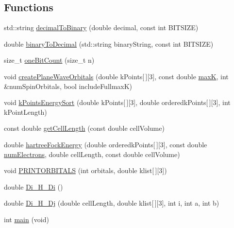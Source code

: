 \subsection*{Functions}
\begin{DoxyCompactItemize}
\item 
std\-::string \hyperlink{kPoints__ordered__FCIQMC_8C_ad90cfa61d31ce5c25047ff4ba86637f1}{decimal\-To\-Binary} (double decimal, const int B\-I\-T\-S\-I\-Z\-E)
\item 
double \hyperlink{kPoints__ordered__FCIQMC_8C_a154b8630a86d66e5317e3cc14e083e71}{binary\-To\-Decimal} (std\-::string binary\-String, const int B\-I\-T\-S\-I\-Z\-E)
\item 
size\-\_\-t \hyperlink{kPoints__ordered__FCIQMC_8C_abbaaa9a01b6be36fec4a4641ffef65cb}{one\-Bit\-Count} (size\-\_\-t n)
\item 
void \hyperlink{kPoints__ordered__FCIQMC_8C_a2feed44d61efa16ddf5d8dbaca3d9bb6}{create\-Plane\-Wave\-Orbitals} (double k\-Points\mbox{[}$\,$\mbox{]}\mbox{[}3\mbox{]}, const double \hyperlink{kPoints__ordered__FCIQMC_8C_a3617ed292f6cccea83811369c46ca12a}{max\-K}, int \&num\-Spin\-Orbitals, bool include\-Fullmax\-K)
\item 
void \hyperlink{kPoints__ordered__FCIQMC_8C_a4e9e2e31b98f67d1f318dff5c1119ca6}{k\-Points\-Energy\-Sort} (double k\-Points\mbox{[}$\,$\mbox{]}\mbox{[}3\mbox{]}, double orderedk\-Points\mbox{[}$\,$\mbox{]}\mbox{[}3\mbox{]}, int k\-Point\-Length)
\item 
const double \hyperlink{kPoints__ordered__FCIQMC_8C_ac6dd2d721900579d23395c49cd3a6ed5}{get\-Cell\-Length} (const double cell\-Volume)
\item 
double \hyperlink{kPoints__ordered__FCIQMC_8C_a4163f9da7388c6cb20df40a344434265}{hartree\-Fock\-Energy} (double orderedk\-Points\mbox{[}$\,$\mbox{]}\mbox{[}3\mbox{]}, const double \hyperlink{UEG__MAIN__binarytest_8C_a613e167ad809e33c73b70a24822cc6f9}{num\-Electrons}, double cell\-Length, const double cell\-Volume)
\item 
void \hyperlink{kPoints__ordered__FCIQMC_8C_a98a978eba3037c271060ce2592b5776d}{P\-R\-I\-N\-T\-O\-R\-B\-I\-T\-A\-L\-S} (int orbitals, double klist\mbox{[}$\,$\mbox{]}\mbox{[}3\mbox{]})
\item 
double \hyperlink{kPoints__ordered__FCIQMC_8C_a397170dcd4b82a5e2dffd639b82b7eb0}{Di\-\_\-\-H\-\_\-\-Di} ()
\item 
double \hyperlink{kPoints__ordered__FCIQMC_8C_a4081aba46bc28f7e0bf16c262ebb9cc2}{Di\-\_\-\-H\-\_\-\-Dj} (double cell\-Length, double klist\mbox{[}$\,$\mbox{]}\mbox{[}3\mbox{]}, int i, int a, int b)
\item 
int \hyperlink{kPoints__ordered__FCIQMC_8C_a840291bc02cba5474a4cb46a9b9566fe}{main} (void)
\end{DoxyCompactItemize}

